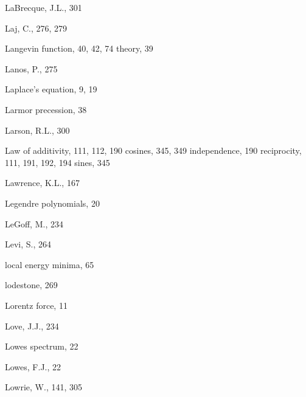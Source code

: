 \documentclass[,plain]{tauxe}
\begin{document}
\begin{theindex}
  \item LaBrecque, J.L., 301
  \item Laj, C., 276, 279
  \item Langevin
    \subitem function, 40, 42, 74
    \subitem theory, 39
  \item Lanos, P., 275
  \item Laplace's equation, 9, 19
  \item Larmor precession, 38
  \item Larson, R.L., 300
  \item Law of
    \subitem additivity, 111, 112, 190
    \subitem cosines, 345, 349
    \subitem independence, 190
    \subitem reciprocity, 111, 191, 192, 194
    \subitem sines, 345
  \item Lawrence, K.L., 167
  \item Legendre polynomials, 20
  \item LeGoff, M., 234
  \item Levi, S., 264
  \item local energy minima, 65
  \item lodestone, 269
  \item Lorentz force, 11
  \item Love, J.J., 234
  \item Lowes spectrum, 22
  \item Lowes, F.J., 22
  \item Lowrie, W., 141, 305

  \indexspace


\end{theindex}
\end{document}
